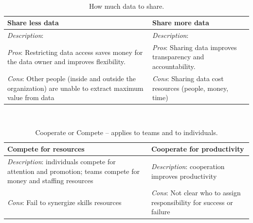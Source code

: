 \ \\

\begin{center}
\begin{table}[ht]
\begin{tabular}{ | m{\dilemmatablewidth}| m{\dilemmatablewidth} | } 
  \hline
  \textbf{Share less data} &
  \textbf{Share more data} \\
  \hline
  \textit{Description}:  &
  \textit{Description}:  \\  
  \hline
  \textit{Pros}: Restricting data access saves money for the data owner and improves flexibility.&
  \textit{Pros}: Sharing data improves transparency and accountability. \\
  \hline
  \textit{Cons}: Other people (inside and outside the organization) are unable to extract maximum value from data & 
  \textit{Cons}: Sharing data cost resources (people, money, time) \\
  \hline
\end{tabular}
\caption{How much data to share.
}
\label{table:data_share-vs-hide}
\end{table}
\end{center}

\ \\

\begin{center}
\begin{table}[ht]
\begin{tabular}{ | m{\dilemmatablewidth}| m{\dilemmatablewidth} | } 
  \hline
  \textbf{Compete for resources} &
  \textbf{Cooperate for productivity} \\
  \hline
  \textit{Description}: individuals compete for attention and promotion; teams compete for money and staffing resources &
  \textit{Description}: cooperation improves productivity \\  
  \hline
  \textit{Cons}: Fail to synergize skills resources & 
  \textit{Cons}: Not clear who to assign responsibility for success or failure \\
  \hline
\end{tabular}
\caption{Cooperate or Compete -- applies to teams and to individuals. 
}
\label{table:cooperate-vs-compete}
\end{table}
\end{center}

\ \\

